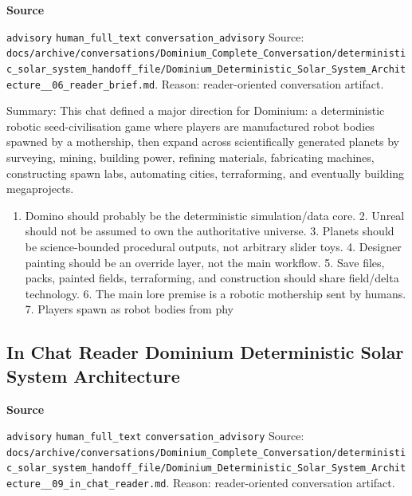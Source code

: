 \documentclass[9pt,a4paper,openany]{book}
\newcommand{\vonecallout}[3]{\par\medskip\noindent\begingroup\setlength{\fboxsep}{7pt}\colorbox{DomCalloutBg}{\parbox{0.94\linewidth}{\textbf{\textcolor{#1}{#2}}\par #3}}\endgroup\par\medskip}
\begin{document}
\vonecallout{DomSlate}{Source}{\texttt{advisory} \texttt{human\_\allowbreak{}full\_\allowbreak{}text} \texttt{conversation\_\allowbreak{}advisory} Source: \texttt{docs/\allowbreak{}archive/\allowbreak{}conversations/\allowbreak{}Dominium\_\allowbreak{}Complete\_\allowbreak{}Conversation/\allowbreak{}deterministic\_\allowbreak{}solar\_\allowbreak{}system\_\allowbreak{}handoff\_\allowbreak{}file/\allowbreak{}Dominium\_\allowbreak{}Deterministic\_\allowbreak{}Solar\_\allowbreak{}System\_\allowbreak{}Architecture\_\allowbreak{}\_\allowbreak{}06\_\allowbreak{}reader\_\allowbreak{}brief.\allowbreak{}md}.\allowbreak{} Reason: reader-\allowbreak{}oriented conversation artifact.\allowbreak{}}

Summary: This chat defined a major direction for Dominium: a deterministic robotic seed-\allowbreak{}civilisation game where players are manufactured robot bodies spawned by a mothership, then expand across scientifically generated planets by surveying, mining, building power, refining materials, fabricating machines, constructing spawn labs, automating cities, terraforming, and eventually building megaprojects.\allowbreak{}


\begin{enumerate}
\item Domino should probably be the deterministic simulation/\allowbreak{}data core.\allowbreak{} 2.\allowbreak{} Unreal should not be assumed to own the authoritative universe.\allowbreak{} 3.\allowbreak{} Planets should be science-\allowbreak{}bounded procedural outputs, not arbitrary slider toys.\allowbreak{} 4.\allowbreak{} Designer painting should be an override layer, not the main workflow.\allowbreak{} 5.\allowbreak{} Save files, packs, painted fields, terraforming, and construction should share field/\allowbreak{}delta technology.\allowbreak{} 6.\allowbreak{} The main lore premise is a robotic mothership sent by humans.\allowbreak{} 7.\allowbreak{} Players spawn as robot bodies from phy
\end{enumerate}


\subsection{In Chat Reader Dominium Deterministic Solar System Architecture}

\vonecallout{DomSlate}{Source}{\texttt{advisory} \texttt{human\_\allowbreak{}full\_\allowbreak{}text} \texttt{conversation\_\allowbreak{}advisory} Source: \texttt{docs/\allowbreak{}archive/\allowbreak{}conversations/\allowbreak{}Dominium\_\allowbreak{}Complete\_\allowbreak{}Conversation/\allowbreak{}deterministic\_\allowbreak{}solar\_\allowbreak{}system\_\allowbreak{}handoff\_\allowbreak{}file/\allowbreak{}Dominium\_\allowbreak{}Deterministic\_\allowbreak{}Solar\_\allowbreak{}System\_\allowbreak{}Architecture\_\allowbreak{}\_\allowbreak{}09\_\allowbreak{}in\_\allowbreak{}chat\_\allowbreak{}reader.\allowbreak{}md}.\allowbreak{} Reason: reader-\allowbreak{}oriented conversation artifact.\allowbreak{}}
\end{document}

